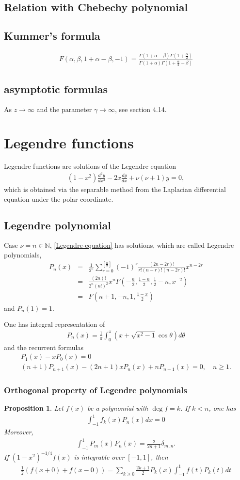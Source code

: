 \documentclass[11pt,reqno]{amsart}
\newcommand{\bea}{\begin{eqnarray}}
\newcommand{\eea}{\end{eqnarray}}
\newcommand{\bna}{\begin{eqnarray*}}
\newcommand{\ena}{\end{eqnarray*}}
\newtheorem{prop}[lemma]{Proposition}
\theoremstyle{definition}
\begin{document}
\subsection{Relation with Chebechy polynomial}
\subsection{Kummer's formula}
\bna
F(\alpha,\beta,1+\alpha-\beta,-1)=\frac{\Gamma(1+\alpha-\beta)\Gamma(1+\frac{\alpha}{2})}
{\Gamma(1+\alpha)\Gamma(1+\frac{\alpha}{2}-\beta)}
\ena
\subsection{asymptotic formulas}As $z\rightarrow\infty$ and the parameter $\gamma\rightarrow\infty$,
see section 4.14.

\section{Legendre functions}
Legendre functions  are solutions of the Legendre equation
\bea
(1-x^2)\frac{d^2y}{dx^2}-2x\frac{dy}{dx}+\nu(\nu+1)y=0,\label{Legendre-equation}
\eea
which is obtained via the separable method from the Laplacian differential equation
under the polar coordinate.


\subsection{Legendre polynomial}
Case $\nu=n\in\mathbb N$, \eqref{Legendre-equation} has solutions, which are called
Legendre polynomials,
\bna
P_n(x)&=&\frac{1}{2^n}\sum_{r=0}^{[\frac{n}{2}]}
(-1)^r\frac{(2n-2r)!}{r!(n-r)!(n-2r)!} x^{n-2r}\\
&=&\frac{(2n)!}{2^n (n!)^2}x^nF\left(-\frac{n}{2},\frac{1-n}{2},\frac{1}{2}-n,x^{-2}\right)\\
&=&F(n+1,-n,1,\frac{1-x}{2})
\ena
and $P_n(1)=1$.

One has integral representation of
\bna
P_n(x)=\frac{1}{\pi}\int_0^\pi (x+\sqrt{x^2-1}\cos\theta)d\theta
\ena
and the recurrent formulas
\bna
&P_1(x)-xP_0(x)=0&\\
&(n+1)P_{n+1}(x)-(2n+1)xP_n(x)+nP_{n-1}(x)=0,\quad n\geq 1.&
\ena
\subsubsection{Orthogonal property of Legendre polynomials}
\begin{prop}Let $f(x)$ be a polynomial with $\deg f=k$. If $k<n$, one has
\bna
\int_{-1}^1 f_k(x)P_n(x)dx=0
\ena
Moreover,
\bna
\int_{-1}^1P_m(x)P_n(x)=\frac{2}{2n+1}\delta_{m,n}.
\ena
If $(1-x^2)^{-1/4}f(x)$ is integrable over $[-1,1]$, then
\bna
\frac{1}{2}(f(x+0)+f(x-0))=\sum_{k\geq 0}\frac{2k+1}{2}P_k(x)
\int_{-1}^1 f(t)P_k(t)dt
\ena
\end{prop}
\end{document}
